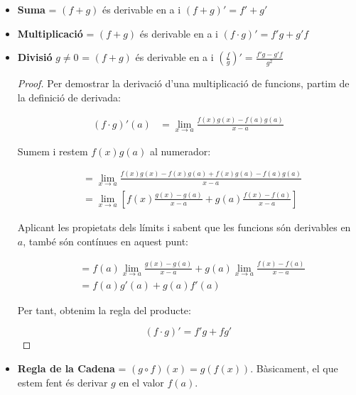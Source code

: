 \documentclass[12pt]{article}
\begin{document}
\begin{itemize}
    \item \textbf{Suma} = $(f+g)$ és derivable en a i $(f+g)' = f' + g'$
    
    \item \textbf{Multiplicació} = $(f+g)$ és derivable en a i $(f\cdot g)' = f'g + g'f$
    
    \item \textbf{Divisió} $g \neq 0$ = $(f+g)$ és derivable en a i $(\frac{f}{g})' = \frac{f'g - g'f}{g^2}$

    \begin{proof}
        Per demostrar la derivació d'una multiplicació de funcions, partim de la definició de derivada:

        \begin{align*}
            (f\cdot g)'(a)
            &= \lim_{x\rightarrow a}
            \frac{f(x)g(x)-f(a)g(a)}{x-a}
        \end{align*}

        Sumem i restem $f(x)g(a)$ al numerador:

        \begin{align*}
            &= \lim_{x\rightarrow a}
            \frac{f(x)g(x)-f(x)g(a)+f(x)g(a)-f(a)g(a)}{x-a}\\[6pt]
            &= \lim_{x\rightarrow a}
            \left[
            f(x)\frac{g(x)-g(a)}{x-a}
            +g(a)\frac{f(x)-f(a)}{x-a}
            \right]
        \end{align*}

        Aplicant les propietats dels límits i sabent que les funcions són derivables en $a$, també són contínues en aquest punt:

        \begin{align*}
            &= f(a)\lim_{x\rightarrow a}\frac{g(x)-g(a)}{x-a}
            +g(a)\lim_{x\rightarrow a}\frac{f(x)-f(a)}{x-a}\\[6pt]
            &= f(a)g'(a)+g(a)f'(a)
        \end{align*}

        Per tant, obtenim la regla del producte:

        \[ \boxed{(f\cdot g)'=f'g+fg'} \]

    \end{proof}

    \item \textbf{Regla de la Cadena} = $(g\circ f)(x)=g(f(x))$. Bàsicament, el que estem fent és derivar $g$ en el valor $f(a)$.


\end{itemize}
\end{document}

